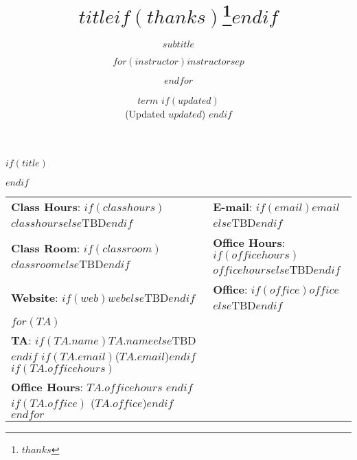 \documentclass[
  $if(fontsize)$
    $fontsize$,
  $else$
    12pt,
  $endif$
  $if(lang)$
    $babel-lang$,
  $endif$
  $if(papersize)$
    $papersize$,
  $endif$
  $for(classoption)$
    $classoption$ $sep$,
  $endfor$]{article}
\title{$title$$if(thanks)$\thanks{$thanks$}$endif$}
\subtitle{$subtitle$}
\author{$for(instructor)$$instructor$$sep$ \and $endfor$}
\date{$term$ 
      $if(updated)$ \\[6pt] \normalsize (Updated $updated$) $endif$}
\begin{document}
  

 $if(title)$
 \maketitle
 $endif$
 
 
\thispagestyle{firststyle}



\begin{tabular*}{\textwidth}{ @{\extracolsep{\fill}} ll @{\extracolsep{\fill}}}

  \textbf{Class Hours}: $if(classhours)$$classhours$$else$TBD$endif$ &
    \textbf{E-mail}: $if(email)$\texttt{$email$}$else$TBD$endif$ \\

  \textbf{Class Room}: $if(classroom)$$classroom$$else$TBD$endif$ &
    \textbf{Office Hours}: $if(officehours)$$officehours$$else$TBD$endif$ \\

  \textbf{Website}: $if(web)$\href{http://$web$}{\tt $web$}$else$TBD$endif$ &
    \textbf{Office}: $if(office)$$office$$else$TBD$endif$ \\

    

  $for(TA)$
    \\[3pt]
    \textbf{TA}: $if(TA.name)$$TA.name$$else$TBD $endif$
                 $if(TA.email)$(\texttt{$TA.email$})$endif$
                 $if(TA.officehours)$ \\ \textbf{Office Hours}: $TA.officehours$ $endif$
                 $if(TA.office)$ ($TA.office$)$endif$
  $endfor$


 \end{tabular*}
 
\vspace{2mm}

\end{document}
